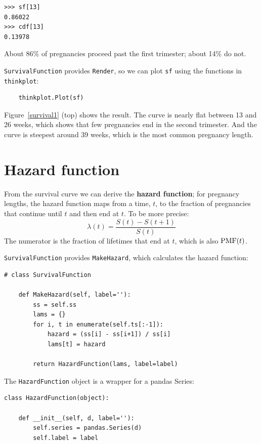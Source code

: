 \documentclass[12pt]{book}
\begin{document}
\begin{verbatim}
>>> sf[13]
0.86022
>>> cdf[13]
0.13978
\end{verbatim}

About 86\% of pregnancies proceed past the first trimester;
about 14\% do not.

\verb"SurvivalFunction" provides \verb"Render", so we can
plot \verb"sf" using the functions in \verb"thinkplot":

\begin{verbatim}
    thinkplot.Plot(sf)
\end{verbatim}

Figure~\ref{survival1} (top) shows the result.  The curve is nearly
flat between 13 and 26 weeks, which shows that few pregnancies
end in the second trimester.  And the curve is steepest around 39
weeks, which is the most common pregnancy length.


\section{Hazard function}
\label{hazard}

From the survival curve we can derive the {\bf hazard function};
for pregnancy lengths, the hazard function maps from a time, $t$, to
the fraction of pregnancies that continue until $t$ and then end at
$t$.  To be more precise:
%
\[ \lambda(t) = \frac{S(t) - S(t+1)}{S(t)} \]
%
The numerator is the fraction of lifetimes that end at $t$, which
is also $\mathrm{PMF}(t)$.

\verb"SurvivalFunction" provides \verb"MakeHazard", which calculates
the hazard function:

\begin{verbatim}
# class SurvivalFunction

    def MakeHazard(self, label=''):
        ss = self.ss
        lams = {}
        for i, t in enumerate(self.ts[:-1]):
            hazard = (ss[i] - ss[i+1]) / ss[i]
            lams[t] = hazard

        return HazardFunction(lams, label=label)
\end{verbatim}

The \verb"HazardFunction" object is a wrapper for a pandas
Series:

\begin{verbatim}
class HazardFunction(object):

    def __init__(self, d, label=''):
        self.series = pandas.Series(d)
        self.label = label
\end{verbatim}
\end{document}
